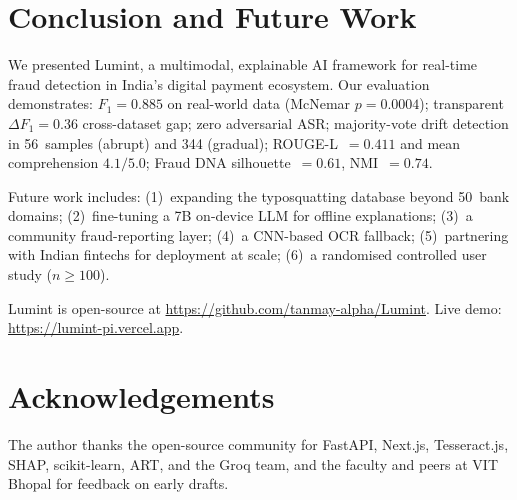 \documentclass[conference]{IEEEtran}
\begin{document}
\section{Conclusion and Future Work}

We presented Lumint, a multimodal, explainable AI framework for
real-time fraud detection in India's digital payment ecosystem. Our
evaluation demonstrates: $F_1{=}0.885$ on real-world data (McNemar
$p{=}0.0004$); transparent $\Delta F_1{=}0.36$ cross-dataset gap;
zero adversarial ASR; majority-vote drift detection in 56~samples
(abrupt) and 344 (gradual); ROUGE-L~$=0.411$ and mean comprehension
$4.1/5.0$; Fraud DNA silhouette~$=0.61$, NMI~$=0.74$.

Future work includes: (1)~expanding the typosquatting database beyond
50~bank domains; (2)~fine-tuning a 7B on-device LLM for offline
explanations; (3)~a community fraud-reporting layer; (4)~a CNN-based
OCR fallback; (5)~partnering with Indian fintechs for deployment at
scale; (6)~a randomised controlled user study ($n{\geq}100$).

Lumint is open-source at \url{https://github.com/tanmay-alpha/Lumint}.
Live demo: \url{https://lumint-pi.vercel.app}.

\section*{Acknowledgements}
The author thanks the open-source community for FastAPI, Next.js,
Tesseract.js, SHAP, scikit-learn, ART, and the Groq team, and the
faculty and peers at VIT Bhopal for feedback on early drafts.
\end{document}
